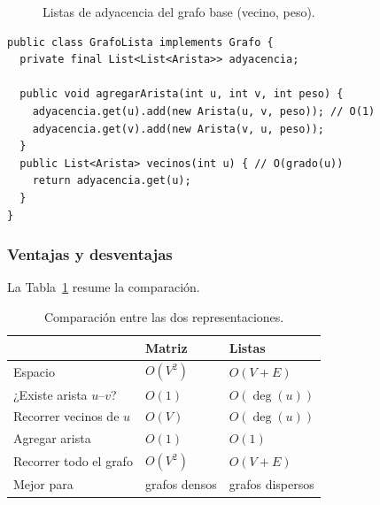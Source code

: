 \documentclass[conference]{IEEEtran}
\begin{document}
\begin{figure}[t]
\centering
{}
\caption{Listas de adyacencia del grafo base (vecino, peso).}
\label{fig:lista}
\end{figure}

\begin{lstlisting}[caption={Núcleo de GrafoLista.java}]
public class GrafoLista implements Grafo {
  private final List<List<Arista>> adyacencia;

  public void agregarArista(int u, int v, int peso) {
    adyacencia.get(u).add(new Arista(u, v, peso)); // O(1)
    adyacencia.get(v).add(new Arista(v, u, peso));
  }
  public List<Arista> vecinos(int u) { // O(grado(u))
    return adyacencia.get(u);
  }
}
\end{lstlisting}

\subsubsection{Ventajas y desventajas}
La Tabla~\ref{tab:repr} resume la comparación.

\begin{table}[t]
\caption{Comparación entre las dos representaciones.}
\label{tab:repr}
\centering
\small
\begin{tabular}{lll}
\toprule
 & \textbf{Matriz} & \textbf{Listas} \\
\midrule
Espacio & $O(V^2)$ & $O(V+E)$ \\
¿Existe arista $u$--$v$? & $O(1)$ & $O(\deg(u))$ \\
Recorrer vecinos de $u$ & $O(V)$ & $O(\deg(u))$ \\
Agregar arista & $O(1)$ & $O(1)$ \\
Recorrer todo el grafo & $O(V^2)$ & $O(V+E)$ \\
Mejor para & grafos densos & grafos dispersos \\
\bottomrule
\end{tabular}
\end{table}
\end{document}
